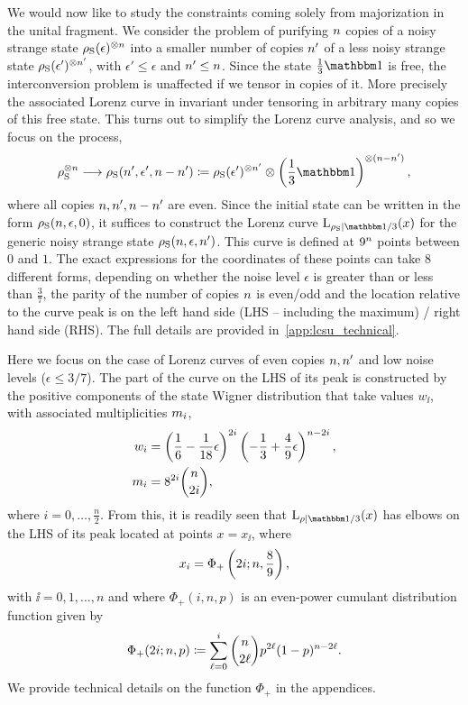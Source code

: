 \documentclass[pra,
aps,
twocolumn,
superscriptaddress,
groupedaddress,
nofootinbib,
reprint
]{revtex4-1}
\begin{document}
We would now like to study the constraints coming solely from majorization in the unital fragment. 
We consider the problem of purifying $\nn$ copies of a noisy strange state $\noisysn$ into a smaller number of copies $\tt$ of a less noisy strange state $\noisys(\epsilon')\too{\tt}$, with $\epsilon' \le \epsilon$ and $\tt \leq \nn$. 
Since the state $\frac{1}{3} \id$ is free, the interconversion problem is unaffected if we tensor in copies of it. More precisely the associated Lorenz curve in invariant under tensoring in arbitrary many copies of this free state.
This turns out to simplify the Lorenz curve analysis, and so we focus on the process,
\begin{equation}\label{eq:sudist}
	\noisys\too{\nn} \longrightarrow \noisys(\tt, \epsilon', \nn - \nn') \coloneqq  \noisys(\epsilon')\too{\tt} \otimes \left( \frac{1}{3}\id \right)\too{(\nn-\tt)},
\end{equation}
where all copies $\nn, \tt, \nn - \tt$ are even.
Since the initial state can be written in the form $\noisys(\nn, \epsilon, 0)$, it suffices to construct the Lorenz curve $\lc{\noisys}{\id/3}(x)$ for the generic noisy strange state $\noisys(\nn, \epsilon ,\tt)$.
This curve is defined at $9^\nn$ points between $0$ and $1$.
The exact expressions for the coordinates of these points can take $8$ different forms, depending on whether the noise level $\epsilon$ is greater than or less than $\frac{3}{7}$, the parity of the number of copies $\nn$ is even/odd and the location relative to the curve peak is on the left hand side (LHS -- including the maximum) / right hand side (RHS).
The full details are provided in~\cref{app:lcsu_technical}.

Here we focus on the case of Lorenz curves of even copies $\nn, \tt$ and low noise levels ($\epsilon \leq 3/7$).
The part of the curve on the LHS of its peak is constructed by the positive components of the state Wigner distribution that take values $w_\ii$, with associated multiplicities $\mlt_\ii$,
\begin{align}
	w_\ii &= \left( \frac{1}{6} - \frac{1}{18}\epsilon \right)^{2\ii}\left( -\frac{1}{3} + \frac{4}{9}\epsilon \right)^{\nn-2\ii}, \\
	m_\ii &= 8^{2\ii}\binom{\nn}{2\ii},
\end{align}
where $i=0,\dots,\frac{n}{2}$.
From this, it is readily seen that $\lc{\rho}{\id/3}(x)$ has elbows on the LHS of its peak located at points $x=x_\ii$, where
\begin{equation}
	x_\ii = \Phi_+ \left( 2\ii; \nn , \frac{8}{9} \right),
\end{equation}
with $\ii = 0,1, \dots , n$ and where $\Phi_+(i,n,p)$ is an even-power cumulant distribution function given by
\begin{equation}
	\Phi_+(2\ii; \nn, p) \coloneqq \sum_{\dummy=0}^{\ii} \binom{\nn}{2\dummy} p ^{2\dummy} (1-p)^{\nn-2\dummy}.
\end{equation}
We provide technical details on the function $\Phi_+$ in the appendices.
\end{document}

